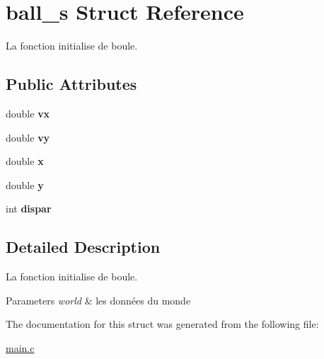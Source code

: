 \hypertarget{structball__s}{\section{ball\-\_\-s Struct Reference}
\label{structball__s}
}


La fonction initialise de boule.  


\subsection*{Public Attributes}
\begin{DoxyCompactItemize}
\item 
\hypertarget{structball__s_a715881bcf5420f98dac1899b0c6af0b6}{double {\bfseries vx}}\label{structball__s_a715881bcf5420f98dac1899b0c6af0b6}

\item 
\hypertarget{structball__s_ae3430263557bdd1969ed50c6af37647a}{double {\bfseries vy}}\label{structball__s_ae3430263557bdd1969ed50c6af37647a}

\item 
\hypertarget{structball__s_a8d2342c7c3c48faadb16d9e1ae8d48ad}{double {\bfseries x}}\label{structball__s_a8d2342c7c3c48faadb16d9e1ae8d48ad}

\item 
\hypertarget{structball__s_ae2a3d07e84e190a1ce16abba2189ec67}{double {\bfseries y}}\label{structball__s_ae2a3d07e84e190a1ce16abba2189ec67}

\item 
\hypertarget{structball__s_af4ddfab934764375e602b9b5135669b9}{int {\bfseries dispar}}\label{structball__s_af4ddfab934764375e602b9b5135669b9}

\end{DoxyCompactItemize}


\subsection{Detailed Description}
La fonction initialise de boule. 


\begin{DoxyParams}{Parameters}
{\em world} & les données du monde \\
\hline
\end{DoxyParams}


The documentation for this struct was generated from the following file\-:\begin{DoxyCompactItemize}
\item 
\hyperlink{main_8c}{main.\-c}\end{DoxyCompactItemize}
